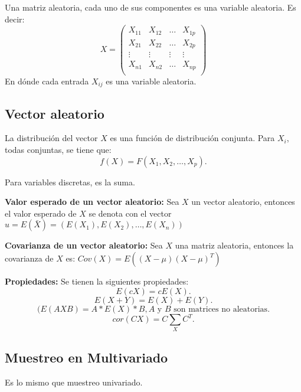 \documentclass{article}
\begin{document}
Una matriz aleatoria, cada uno de sus componentes es una variable aleatoria. Es decir:
\[
X= 
\begin{pmatrix}
X_{11} & X_{12} & \ldots & X_{1p} \\
X_{21} & X_{22} & \ldots & X_{2p} \\
\vdots & \vdots & \vdots & \vdots \\
X_{n1} & X_{n2} & \ldots & X_{np} \\
\end{pmatrix}
\]
En dónde cada entrada $X_{ij}$ es una variable aleatoria.

\subsection{Vector aleatorio}
La distribución del vector $X$ es una función de distribución conjunta. Para $X_{i}$, todas conjuntas, se tiene que:
\[ f(X)=F(X_{1},X_{2},\ldots,X_{p}).\]

Para variables discretas, es la suma.

\textbf{Valor esperado de un vector aleatorio: } Sea $X$ un vector aleatorio, entonces el valor esperado de $X$ se denota con el vector $u=E(\bar{X})=(E(X_{1}),E(X_{2}),\ldots,E(X_{n}))$

\textbf{Covarianza de un vector aleatorio: }Sea $X$ una matriz aleatoria, entonces la covarianza de $X$ es: $Cov(X)=E((X-\mu)(X-\mu)^{T})$

\textbf{Propiedades:} Se tienen la siguientes propiedades:
\[ E(cX) = cE(X).\]
\[ E(X+Y)=E(X)+E(Y).\]
\[ (E(AXB) = A*E(X)*B, \text{$A$ y $B$ son matrices no aleatorias}.\]
\[ cor(CX)=C\sum_{X}C^{T}.\]

\subsection{Muestreo en Multivariado}
Es lo mismo que muestreo univariado.
\end{document}
